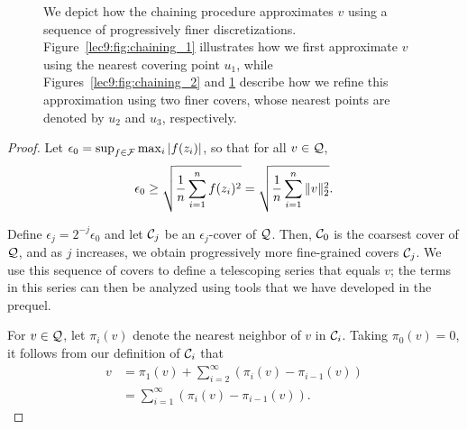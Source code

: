 \begin{figure}[ht!]
\begin{subfigure}[t]{0.45\textwidth}
        \caption{}
        \label{lec9:fig:chaining_3}
    \end{subfigure}
    \caption{We depict how the chaining procedure approximates $v$ using a sequence of progressively finer discretizations. Figure~\ref{lec9:fig:chaining_1} illustrates how we first approximate $v$ using the nearest covering point $u_1$, while Figures~\ref{lec9:fig:chaining_2} and \ref{lec9:fig:chaining_3} describe how we refine this approximation using two finer covers, whose nearest points are denoted by $u_2$ and $u_3$, respectively.}
    \label{lec9:fig:chaining_diag}
\end{figure}

\begin{proof} 
    Let $\epsilon_0 = \sup_{f\in \mathcal F} \max_i \left\lvert f(z_i)\right\rvert$, so that for all $v \in \mathcal Q$,
    \begin{equation}
        \epsilon_0 \ge \sqrt{\frac 1 n \sum_{i=1}^nf(z_i)^2}  = \sqrt{\frac 1 n \sum_{i=1}^n \|v\|_2^2}.
    \end{equation}
    
    Define $\epsilon_j = 2^{-j}\epsilon_0$ and let $\mathcal C_j$ be an $\epsilon_j$-cover of $\mathcal Q$. Then, $\mathcal C_0$ is the coarsest cover of $\mathcal Q$, and as $j$ increases, we obtain progressively more fine-grained covers $\mathcal C_j$. We use this sequence of covers to define a telescoping series that equals $v$; the terms in this series can then be analyzed using tools that we have developed in the prequel. 
    
    For $v \in \mathcal Q$, let $\pi_i(v)$ denote the nearest neighbor of $v$ in $\mathcal C_i$. Taking $\pi_0(v) = 0$, it follows from our definition of $\mathcal C_i$ that
    \begin{align}
        v &= \pi_1(v) + \sum_{i = 2}^\infty (\pi_i(v) - \pi_{i - 1}(v)) \\
        &= \sum_{i = 1}^\infty (\pi_i(v) - \pi_{i - 1}(v)). \label{lec9:eqn:telescope_chain}
    \end{align}
    

\end{proof}
